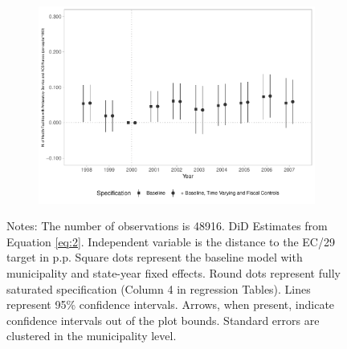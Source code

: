 \begin{figure}[h!]
\begin{center}
\begin{subfigure}{0.32\textwidth}
        \includegraphics[width=\textwidth]{plots/sia_ncnes_enfacs_pcapita_dist_ec29_baseline_dist_ec29_baseline_12.pdf}
    \end{subfigure}
    
    \end{center}
    
                \scriptsize{Notes: The number of observations is 48916. DiD Estimates from Equation \ref{eq:2}. Independent variable is the distance to the EC/29 target in p.p. Square dots represent the baseline model with municipality and state-year fixed effects. Round dots represent fully saturated specification (Column 4 in regression Tables). Lines represent 95\% confidence intervals. Arrows, when present, indicate confidence intervals out of the plot bounds. Standard errors are clustered in the municipality level.}
    
\end{figure}